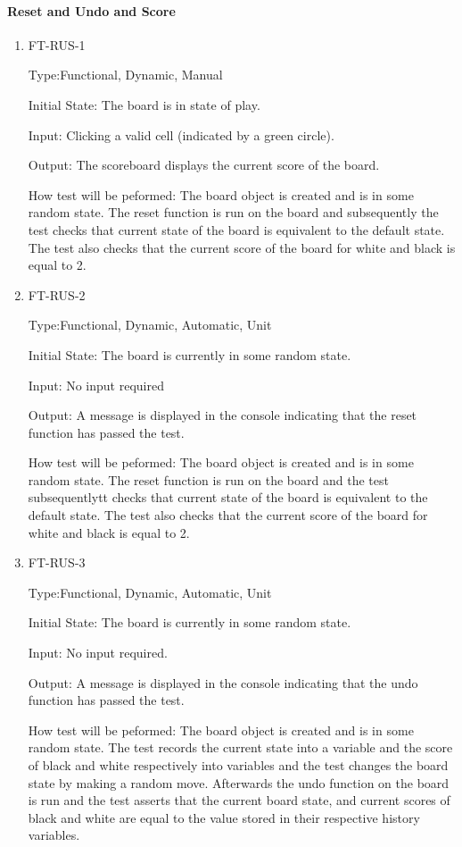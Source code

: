 \documentclass[12pt, titlepage]{article}
\begin{document}
\paragraph{Reset and Undo and Score}
\begin{enumerate}

	\item FT-RUS-1

	      Type:Functional, Dynamic, Manual

	      Initial State: The board is in state of play.

	      Input: Clicking a valid cell (indicated by a green circle).

	      Output: The scoreboard displays the current score of the board.

	      How test will be peformed:  The board object is created and  is in some random state. The reset function is  run on the board  and subsequently the test checks that current state of the board is equivalent to the default state.
	      The test also checks that the current score of the board for white and black is equal to 2.

	\item FT-RUS-2

	      Type:Functional, Dynamic, Automatic, Unit

	      Initial State: The board is currently in some random state.

	      Input: No input required

	      Output: A message is displayed in the console indicating that the reset function has passed the test.

	      How test will be peformed:  The board object is created and  is in some random state. The reset function is  run on the board and the test subsequentlytt checks that current state of the board is equivalent to the default state.
	      The test also checks that the current score of the board for white and black is equal to 2.

	\item FT-RUS-3

	      Type:Functional, Dynamic, Automatic, Unit

	      Initial State:   The board is currently in some random state.

	      Input: No input required.

	      Output: A message is displayed in the console indicating that the undo function has passed the test.

	      How test will be peformed: The board object is created and is in some random state. The test records the current state into a variable and the score of black and white respectively into variables and the test changes the board state by making a random move. Afterwards the undo function on the board is run and the test asserts that the current board state, and current scores of black and white are equal to the value stored in their respective history variables.


\end{enumerate}
\end{document}
